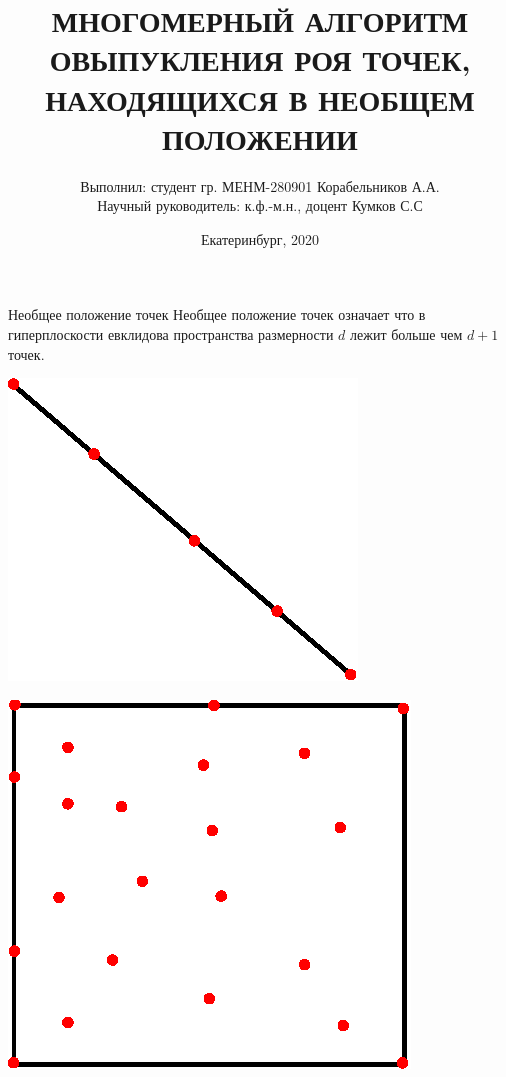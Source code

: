 \documentclass[]{beamer} %
\begin{document}
\title{МНОГОМЕРНЫЙ АЛГОРИТМ ОВЫПУКЛЕНИЯ РОЯ ТОЧЕК, НАХОДЯЩИХСЯ В НЕОБЩЕМ ПОЛОЖЕНИИ}
\author[Корабельников А.А.]{\scriptsize Выполнил: студент гр. МЕНМ-280901 Корабельников А.А.\\Научный руководитель: к.ф.-м.н., доцент Кумков С.С}
\date{Екатеринбург, 2020}
\frame{\titlepage}
\begin{frame}{Необщее положение точек}
   Необщее положение точек означает что в гиперплоскости евклидова пространства размерности $d$ лежит больше чем $d +1$ точек.\\
   \vfill
    \begin{minipage}{.49\textwidth}
    \centering
    \includegraphics[width=0.5\linewidth]{line.eps}
  \end{minipage}
  \begin{minipage}{.49\textwidth}
    \centering
    \includegraphics[width=0.5\linewidth]{cube1.eps}
  \end{minipage}
\end{frame}
\end{document}
